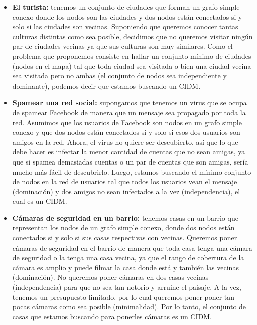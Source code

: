 \begin{itemize}
\item \textbf{El turista:} tenemos un conjunto de ciudades que forman un grafo simple conexo donde los nodos son las ciudades y dos nodos están conectados si y solo si las ciudades son vecinas. Suponiendo que queremos conocer tantas culturas distintas como sea posible, decidimos que no queremos visitar ningún par de ciudades vecinas ya que sus culturas son muy similares. Como el problema que proponemos consiste en hallar un conjunto mínimo de ciudades (nodos en el mapa) tal que toda ciudad sea visitada o bien una ciudad vecina sea visitada pero no ambas (el conjunto de nodos sea independiente y dominante), podemos decir que estamos buscando un CIDM.
\item \textbf{Spamear una red social:} supongamos que tenemos un virus que se ocupa de spamear Facebook de manera que un mensaje sea propagado por toda la red. Asumimos que los usuarios de Facebook son nodos en un grafo simple conexo y que dos nodos están conectados si y solo si esos dos usuarios son amigos en la red. Ahora, el virus no quiere ser descubierto, así que lo que debe hacer es infectar la menor cantidad de cuentas que no sean amigas, ya que si spamea demasiadas cuentas o un par de cuentas que son amigas, sería mucho más fácil de descubrirlo. Luego, estamos buscando el mínimo conjunto de nodos en la red de usuarios tal que todos los usuarios vean el mensaje (dominación) y dos amigos no sean infectados a la vez (independencia), el cual es un CIDM.
\item \textbf{Cámaras de seguridad en un barrio:} tenemos casas en un barrio que representan los nodos de un grafo simple conexo, donde dos nodos están conectados si y solo si sus casas respectivas con vecinas. Queremos poner cámaras de seguridad en el barrio de manera que toda casa tenga una cámara de seguridad o la tenga una casa vecina, ya que el rango de cobertura de la cámara es amplio y puede filmar la casa donde está y también las vecinas (dominación). No queremos poner cámaras en dos casas vecinas (independencia) para que no sea tan notorio y arruine el paisaje. A la vez, tenemos un presupuesto limitado, por lo cual queremos poner poner tan pocas cámaras como sea posible (minimalidad). Por lo tanto, el conjunto de casas que estamos buscando para ponerles cámaras es un CIDM.
\end{itemize}
